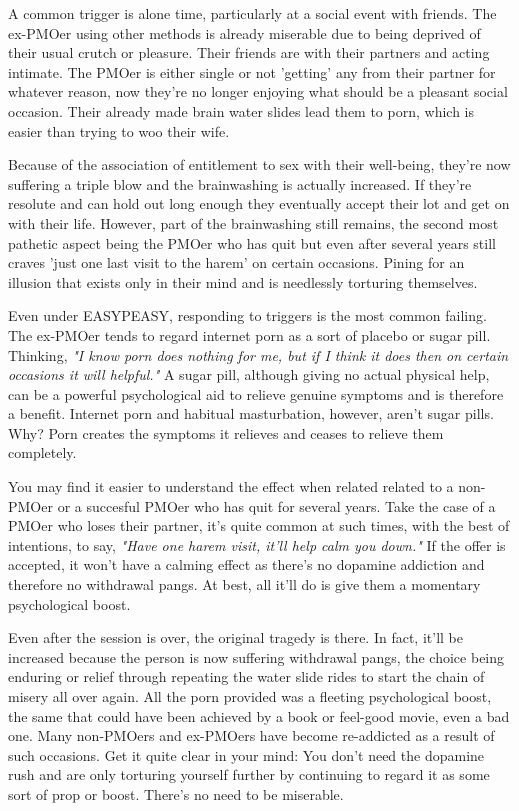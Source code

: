 \documentclass[easypeasy.tex]{subfiles}
\begin{document}
A common trigger is alone time, particularly at a social event with friends. The ex-PMOer using other methods is already miserable due to being deprived of their usual crutch or pleasure. Their friends are with their partners and acting intimate. The PMOer is either single or not 'getting' any from their partner for whatever reason, now they're no longer enjoying what should be a pleasant social occasion. Their already made brain water slides lead them to porn, which is easier than trying to woo their wife.

Because of the association of entitlement to sex with their well-being, they're now suffering a triple blow and the brainwashing is actually increased. If they're resolute and can hold out long enough they eventually accept their lot and get on with their life. However, part of the brainwashing still remains, the second most pathetic aspect being the PMOer who has quit but even after several years still craves 'just one last visit to the harem' on certain occasions. Pining for an illusion that exists only in their mind and is needlessly torturing themselves.

Even under EASYPEASY, responding to triggers is the most common failing. The ex-PMOer tends to regard internet porn as a sort of placebo or sugar pill. Thinking, \textit{"I know porn does nothing for me, but if I think it does then on certain occasions it will helpful."} A sugar pill, although giving no actual physical help, can be a powerful psychological aid to relieve genuine symptoms and is therefore a benefit. Internet porn and habitual masturbation, however, aren't sugar pills. Why? Porn creates the symptoms it relieves and ceases to relieve them completely.

You may find it easier to understand the effect when related related to a non-PMOer or a succesful PMOer who has quit for several years. Take the case of a PMOer who loses their partner, it's quite common at such times, with the best of intentions, to say, \textit{"Have one harem visit, it'll help calm you down."} If the offer is accepted, it won't have a calming effect as there's no dopamine addiction and therefore no withdrawal pangs. At best, all it'll do is give them a momentary psychological boost.

Even after the session is over, the original tragedy is there. In fact, it'll be increased because the person is now suffering withdrawal pangs, the choice being enduring or relief through repeating the water slide rides to start the chain of misery all over again. All the porn provided was a fleeting psychological boost, the same that could have been achieved by a book or feel-good movie, even a bad one. Many non-PMOers and ex-PMOers have become re-addicted as a result of such occasions. Get it quite clear in your mind: You don't need the dopamine rush and are only torturing yourself further by continuing to regard it as some sort of prop or boost. There's no need to be miserable.
\end{document}
